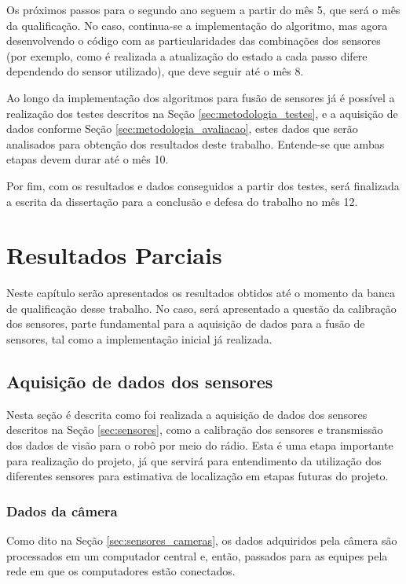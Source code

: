 \documentclass[acronym, symbols, table]{fei}
\begin{document}
		Os próximos passos para o segundo ano seguem a partir do mês 5, que será o mês da qualificação. No caso, continua-se a implementação do algoritmo, mas agora desenvolvendo o código com as particularidades das combinações dos sensores (por exemplo, como é realizada a atualização do estado a cada passo difere dependendo do sensor utilizado), que deve seguir até o mês 8.
		
		Ao longo da implementação dos algoritmos para fusão de sensores já é possível a realização dos testes descritos na Seção \ref{sec:metodologia_testes}, e a aquisição de dados conforme Seção \ref{sec:metodologia_avaliacao}, estes dados que serão analisados para obtenção dos resultados deste trabalho. Entende-se que ambas etapas devem durar até o mês 10.
		
		Por fim, com os resultados e dados conseguidos a partir dos testes, será finalizada a escrita da dissertação para a conclusão e defesa do trabalho no mês 12.
		
	\chapter{Resultados Parciais}\label{sec:resultados_parciais}
		Neste capítulo serão apresentados os resultados obtidos até o momento da banca de qualificação desse trabalho. No caso, será apresentado a questão da calibração dos sensores, parte fundamental para a aquisição de dados para a fusão de sensores, tal como a implementação inicial já realizada.
		
		\section{Aquisição de dados dos sensores} \label{sec:resultados_aquisicao_dados}
			Nesta seção é descrita como foi realizada a aquisição de dados dos sensores descritos na Seção \ref{sec:sensores}, como a calibração dos sensores e transmissão dos dados de visão para o robô por meio do rádio. Esta é uma etapa importante para realização do projeto, já que servirá para entendimento da utilização dos diferentes sensores para estimativa de localização em etapas futuras do projeto.
			
			\subsection{Dados da câmera}
				Como dito na Seção \ref{sec:sensores_cameras}, os dados adquiridos pela câmera são processados em um computador central e, então, passados para as equipes pela rede em que os computadores estão conectados.
				
\end{document}
